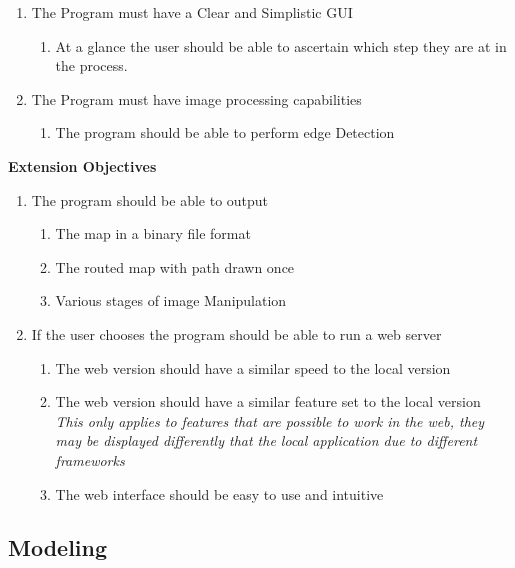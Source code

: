 \begin{flushleft}
\begin{enumerate}
            \item The Program must have a Clear and Simplistic GUI
            \begin{enumerate}
                \item At a glance the user should be able to ascertain which step they are at in the process.
            \end{enumerate}

            \item The Program must have image processing capabilities
            \begin{enumerate}
                \item The program should be able to perform edge Detection
            \end{enumerate}
            \bk          
        \end{enumerate}  
        
        \vspace{1cm}
        \centerline{\large\textbf{Extension Objectives}}
        \vspace{1cm}

        \begin{enumerate}[resume]
            \item The program should be able to output
            \begin{enumerate}
                \item The map in a binary file format 
                \item The routed map with path drawn once
                \item Various stages of image Manipulation
            \end{enumerate}
            \item If the user chooses the program should be able to run a web server
            \begin{enumerate}
                \item The web version should have a similar speed to the local version
                \item The web version should have a similar feature set to the local version \\
                \emph{This only applies to features that are possible to work in the web, they may be displayed differently that the local application due to different frameworks}
                \item The web interface should be easy to use and intuitive
            \end{enumerate} 
        \end{enumerate}

        \bk

        \subsection{Modeling}
        \bk

\end{flushleft}